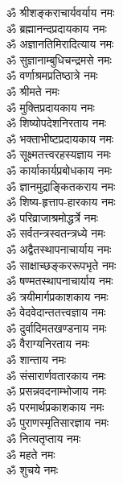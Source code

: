 \begin{multicols}{2}
    \begin{flushleft}
        ॐ श्रीशङ्कराचार्यवर्याय नमः\\
        ॐ ब्रह्मानन्दप्रदायकाय नमः\\
        ॐ अज्ञानतिमिरादित्याय नमः\\
        ॐ सुज्ञानाम्बुधिचन्द्रमसे  नमः\\
        ॐ वर्णाश्रमप्रतिष्ठात्रे नमः\\
        ॐ श्रीमते नमः\\
        ॐ मुक्तिप्रदायकाय नमः\\
        ॐ शिष्योपदेशनिरताय नमः\\
        ॐ भक्ताभीष्टप्रदायकाय नमः\\
        ॐ सूक्ष्मतत्त्वरहस्यज्ञाय नमः\hfill{}\\
                                        
        ॐ कार्याकार्यप्रबोधकाय नमः\\
        ॐ ज्ञानमुद्राङ्कितकराय नमः\\
        ॐ शिष्य-हृत्ताप-हारकाय नमः\\
        ॐ परिव्राजाश्रमोद्धर्त्रे नमः\\
        ॐ सर्वतन्त्रस्वतन्त्रध्ये नमः\\
        ॐ अद्वैतस्थापनाचार्याय नमः\\
        ॐ साक्षाच्छङ्कररूपभृते नमः\\
        ॐ षण्मतस्थापनाचार्याय नमः\\
        ॐ त्रयीमार्गप्रकाशकाय नमः\\
        ॐ वेदवेदान्ततत्त्वज्ञाय नमः\hfill{}\\
                                        
        ॐ दुर्वादिमतखण्डनाय नमः\\
        ॐ वैराग्यनिरताय नमः\\
        ॐ शान्ताय नमः\\
        ॐ संसारार्णवतारकाय नमः\\
        ॐ प्रसन्नवदनाम्भोजाय नमः\\
        ॐ परमार्थप्रकाशकाय नमः\\
        ॐ पुराणस्मृतिसारज्ञाय नमः\\
        ॐ नित्यतृप्ताय नमः\\
        ॐ महते नमः\\
        ॐ शुचये नमः\hfill{}\\
                                        

\end{flushleft}
\end{multicols}
